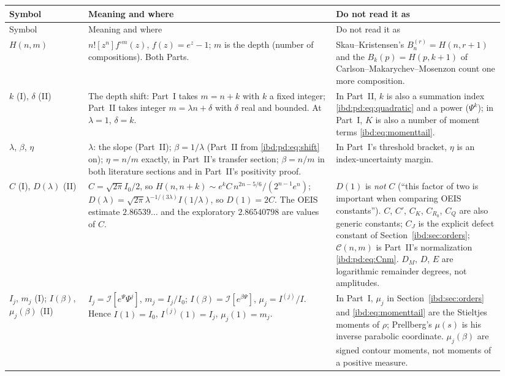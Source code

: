 \documentclass[11pt,letterpaper]{article}
\theoremstyle{remark}\newtheorem{remark}[theorem]{Remark}
\newcommand{\I}{\mathcal I}
\begin{document}
{\small
\begin{longtable}{@{}>{\raggedright\arraybackslash}p{0.15\linewidth}>{\raggedright\arraybackslash}p{0.47\linewidth}>{\raggedright\arraybackslash}p{0.32\linewidth}@{}}
\toprule
Symbol & Meaning and where & Do not read it as\\
\midrule
\endfirsthead
\toprule
Symbol & Meaning and where & Do not read it as\\
\midrule
\endhead
\bottomrule
\endfoot
$H(n,m)$ & $n![z^n]f^{\circ m}(z)$, $f(z)=e^z-1$; $m$ is the depth (number of compositions). Both Parts. & Skau--Kristensen's $B^{(r)}_n=H(n,r+1)$ and the $B_k(p)=H(p,k+1)$ of Carlson--Makarychev--Mosenzon count one more composition.\\
$k$ (I), $\delta$ (II) & The depth shift: Part~I takes $m=n+k$ with $k$ a fixed integer; Part~II takes integer $m=\lambda n+\delta$ with $\delta$ real and bounded. At $\lambda=1$, $\delta=k$. & In Part~II, $k$ is also a summation index \eqref{ibd:pd:eq:quadratic} and a power ($\Psi^k$); in Part~I, $K$ is also a number of moment terms \eqref{ibd:eq:momenttail}.\\
$\lambda$, $\beta$, $\eta$ & $\lambda$: the slope (Part~II); $\beta=1/\lambda$ (Part~II from \eqref{ibd:pd:eq:shift} on); $\eta=n/m$ exactly, in Part~II's transfer section; $\beta=n/m$ in both literature sections and in Part~II's positivity proof. & In Part~I's threshold bracket, $\eta$ is an index-uncertainty margin.\\
$C$ (I), $D(\lambda)$ (II) & $C=\sqrt{2\pi}I_0/2$, so $H(n,n+k)\sim e^kC\,n^{2n-5/6}/(2^{n-1}e^n)$; $D(\lambda)=\sqrt{2\pi}\lambda^{-1/(3\lambda)}I(1/\lambda)$, so $D(1)=2C$. The OEIS estimate $2.86539\ldots$ and the exploratory $2.86540798$ are values of $C$. & $D(1)$ is \emph{not} $C$ (``this factor of two is important when comparing OEIS constants''). $C$, $C'$, $C_K$, $C_{R_0}$, $C_Q$ are also generic constants; $C_J$ is the explicit defect constant of Section~\ref{ibd:sec:orders}; $\mathcal C(n,m)$ is Part~II's normalization \eqref{ibd:pd:eq:Cnm}. $D_M$, $D$, $E$ are logarithmic remainder degrees, not amplitudes.\\
$I_j$, $m_j$ (I); $I(\beta)$, $\mu_j(\beta)$ (II) & $I_j=\I[e^\Psi\Psi^j]$, $m_j=I_j/I_0$; $I(\beta)=\I[e^{\beta\Psi}]$, $\mu_j=I^{(j)}/I$. Hence $I(1)=I_0$, $I^{(j)}(1)=I_j$, $\mu_j(1)=m_j$. & In Part~I, $\mu_j$ in Section~\ref{ibd:sec:orders} and \eqref{ibd:eq:momenttail} are the Stieltjes moments of $\rho$; Prellberg's $\mu(s)$ is his inverse parabolic coordinate. $\mu_j(\beta)$ are signed contour moments, not moments of a positive measure.\\

\end{longtable}}
\end{document}
